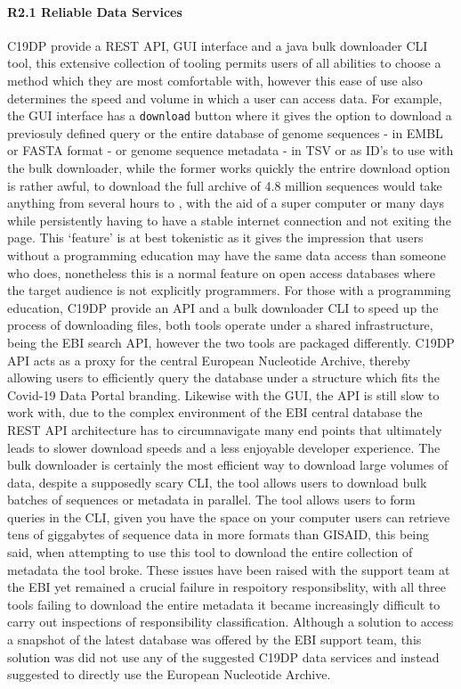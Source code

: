 \documentclass{article}
\begin{document}
\hypertarget{r2.1-reliable-data-services-1}{%
\paragraph{R2.1 Reliable Data
Services}\label{r2.1-reliable-data-services-1}}

C19DP provide a REST API, GUI interface and a java bulk downloader CLI
tool, this extensive collection of tooling permits users of all
abilities to choose a method which they are most comfortable with,
however this ease of use also determines the speed and volume in which a
user can access data. For example, the GUI interface has a
\texttt{download} button where it gives the option to download a
previosuly defined query or the entire database of genome sequences - in
EMBL or FASTA format - or genome sequence metadata - in TSV or as ID's
to use with the bulk downloader, while the former works quickly the
entrire download option is rather awful, to download the full archive of
4.8 million sequences would take anything from several hours to , with
the aid of a super computer or many days while persistently having to
have a stable internet connection and not exiting the page. This
`feature' is at best tokenistic as it gives the impression that users
without a programming education may have the same data access than
someone who does, nonetheless this is a normal feature on open access
databases where the target audience is not explicitly programmers. For
those with a programming education, C19DP provide an API and a bulk
downloader CLI to speed up the process of downloading files, both tools
operate under a shared infrastructure, being the EBI search API, however
the two tools are packaged differently. C19DP API acts as a proxy for
the central European Nucleotide Archive, thereby allowing users to
efficiently query the database under a structure which fits the Covid-19
Data Portal branding. Likewise with the GUI, the API is still slow to
work with, due to the complex environment of the EBI central database
the REST API architecture has to circumnavigate many end points that
ultimately leads to slower download speeds and a less enjoyable
developer experience. The bulk downloader is certainly the most
efficient way to download large volumes of data, despite a supposedly
scary CLI, the tool allows users to download bulk batches of sequences
or metadata in parallel. The tool allows users to form queries in the
CLI, given you have the space on your computer users can retrieve tens
of giggabytes of sequence data in more formats than GISAID, this being
said, when attempting to use this tool to download the entire collection
of metadata the tool broke. These issues have been raised with the
support team at the EBI yet remained a crucial failure in respoitory
responsibslity, with all three tools failing to download the entire
metadata it became increasingly difficult to carry out inspections of
responsibility classification. Although a solution to access a snapshot
of the latest database was offered by the EBI support team, this
solution was did not use any of the suggested C19DP data services and
instead suggested to directly use the European Nucleotide Archive.
\end{document}
